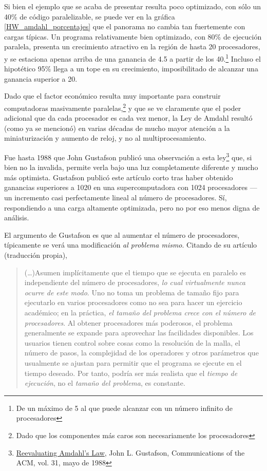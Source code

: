 \documentclass[11pt,fleqn]{book} %
\begin{document}
Si bien el ejemplo que se acaba de presentar resulta poco optimizado, con sólo
un 40\% de código paralelizable, se puede ver en la gráfica
\ref{HW_amdahl_porcentajes} que el panorama no cambia tan fuertemente
con cargas típicas. Un programa relativamente bien optimizado, con 80\%
de ejecución paralela, presenta un crecimiento atractivo en la región
de hasta 20 procesadores, y se estaciona apenas arriba de una ganancia
de 4.5 a partir de los 40.\footnote{De un máximo de 5 al que puede
alcanzar con un número infinito de procesadores } Incluso el hipotético
95\% llega a un tope en su crecimiento, imposibilitado de alcanzar una
ganancia superior a 20.

Dado que el factor económico resulta muy importante para construir
computadoras masivamente paralelas,\footnote{Dado que los componentes más
caros son necesariamente los procesadores } y que se ve claramente que
el poder adicional que da cada procesador es cada vez menor, la
Ley de Amdahl resultó (como ya se mencionó) en varias décadas de mucho
mayor atención a la miniaturización y aumento de reloj, y no al
multiprocesamiento.

Fue hasta 1988 que John Gustafson publicó una observación a esta
ley\footnote{\href{http://www.johngustafson.net/pubs/pub13/amdahl.htm}{Reevaluating Amdahl's Law}, John L. Gustafson, Communications
of the ACM, vol. 31, mayo de 1988 } que, si bien no la invalida,
permite verla bajo una luz completamente diferente y mucho más
optimista. Gustafson publicó este artículo corto tras haber obtenido
ganancias superiores a 1020 en una supercomputadora con 1024
procesadores — un incremento casi perfectamente lineal al número de
procesadores. Sí, respondiendo a una carga altamente optimizada, pero
no por eso menos digna de análisis.

El argumento de Gustafson es que al aumentar el número de
procesadores, típicamente se verá una modificación \emph{al problema mismo}. Citando de su artículo (traducción propia),

\begin{quote}
(\ldots{})Asumen implícitamente que el tiempo que se ejecuta en paralelo es
independiente del número de procesadores, \emph{lo cual virtualmente nunca ocurre de este modo}. Uno no toma un problema de tamaño fijo para
ejecutarlo en varios procesadores como no sea para hacer un
ejercicio académico; en la práctica, \emph{el tamaño del problema crece con el número de procesadores}. Al obtener procesadores más poderosos, el
problema generalmente se expande para aprovechar las facilidades
disponibles. Los usuarios tienen control sobre cosas como la
resolución de la malla, el número de pasos, la complejidad de los
operadores y otros parámetros que usualmente se ajustan para permitir
que el programa se ejecute en el tiempo deseado. Por tanto, podría ser más
realista que el \emph{tiempo de ejecución}, no el \emph{tamaño del problema}, es
constante.
\end{quote}
\end{document}
